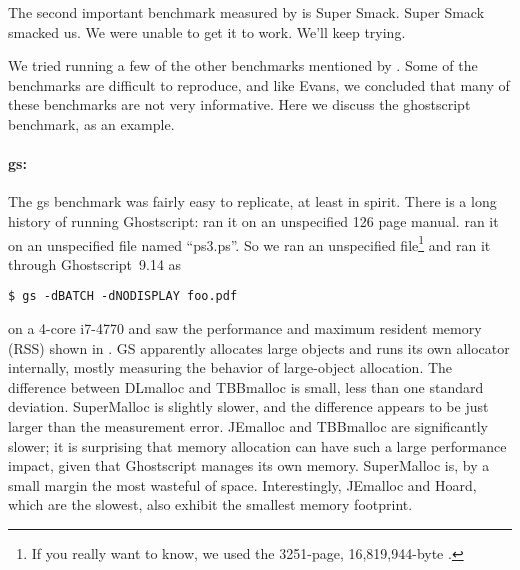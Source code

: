 \documentclass{sigplanconf}
\begin{document}
The second important benchmark measured by \cite{Evans06} is Super
Smack.  Super Smack smacked us.  We were unable to get it to work.
We'll keep trying.

We tried running a few of the other benchmarks mentioned by
\cite{Evans06}.  Some of the benchmarks are difficult to reproduce,
and like Evans, we concluded that many of these benchmarks are not
very informative.  Here we discuss the ghostscript benchmark, as an example.

{\paragraph{gs:}} The gs benchmark was fairly easy to replicate, at
least in spirit.  There is a long history of running Ghostscript:
\cite{DetlefsDoZo94} ran it on an unspecified 126 page manual.
\cite{Evans06} ran it on an unspecified file named ``ps3.ps''.  So we
ran an unspecified file\footnote{If you really want to know, we used
  the 3251-page, 16,819,944-byte \cite{Intel13}.}  and ran it through
Ghostscript~9.14 as
\begin{verbatim}
$ gs -dBATCH -dNODISPLAY foo.pdf
\end{verbatim}
on a 4-core i7-4770 and saw the performance and maximum resident
memory (RSS) shown in .  GS apparently allocates large
objects and runs its own allocator internally, mostly measuring the
behavior of large-object allocation.  The difference between DLmalloc
and TBBmalloc is small, less than one standard deviation.  SuperMalloc
is slightly slower, and the difference appears to be just larger than
the measurement error.  JEmalloc and TBBmalloc are significantly
slower; it is surprising that memory allocation can have such a large
performance impact, given that Ghostscript manages its own memory.
SuperMalloc is, by a small margin the most wasteful of space.
Interestingly, JEmalloc and Hoard, which are the slowest, also exhibit
the smallest memory footprint.
\end{document}
